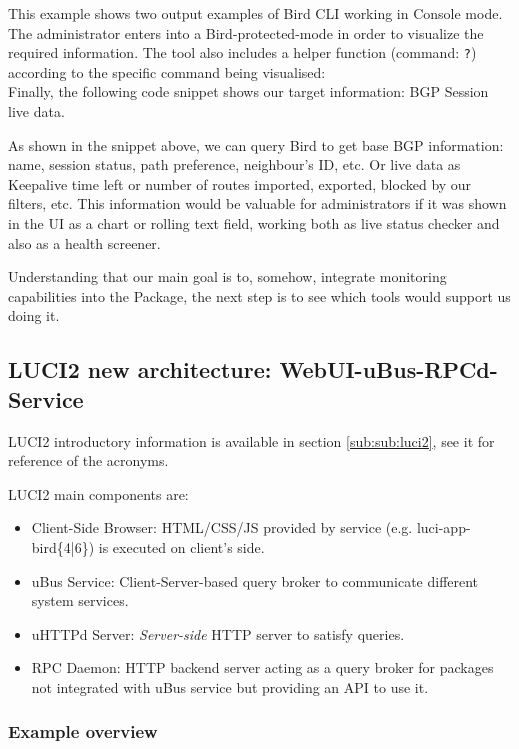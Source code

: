 This example shows two output examples of Bird CLI working in Console mode. The administrator enters into a Bird-protected-mode in order to visualize the required information. The tool also includes a helper function (command: \texttt{?}) according to the specific command being visualised:\\



Finally, the following code snippet shows our target information: BGP Session live data.



As shown in the snippet above, we can query Bird to get base BGP information: name, session status, path preference, neighbour's ID, etc. Or live data as Keepalive time left or number of routes imported, exported, blocked by our filters, etc. This information would be valuable for administrators if it was shown in the UI as a chart or rolling text field, working both as live status checker and also as a health screener.

Understanding that our main goal is to, somehow, integrate monitoring capabilities into the Package, the next step is to see which tools would support us doing it.

\subsection{LUCI2 new architecture: WebUI-uBus-RPCd-Service}
\label{sub:luci2arch}
LUCI2 introductory information is available in section \ref{sub:sub:luci2}, see it for reference of the acronyms.

LUCI2 main components are: 

\begin{itemize}
    \item Client-Side Browser: HTML/CSS/JS provided by service (e.g. luci-app-bird\{4|6\}) is executed on client's side.
    \item uBus Service: Client-Server-based query broker to communicate different system services.
    \item uHTTPd Server: \textit{Server-side} HTTP server to satisfy queries.
    \item RPC Daemon: HTTP backend server acting as a query broker for packages not integrated with uBus service but providing an API to use it.
\end{itemize}


\subsubsection{Example overview}

